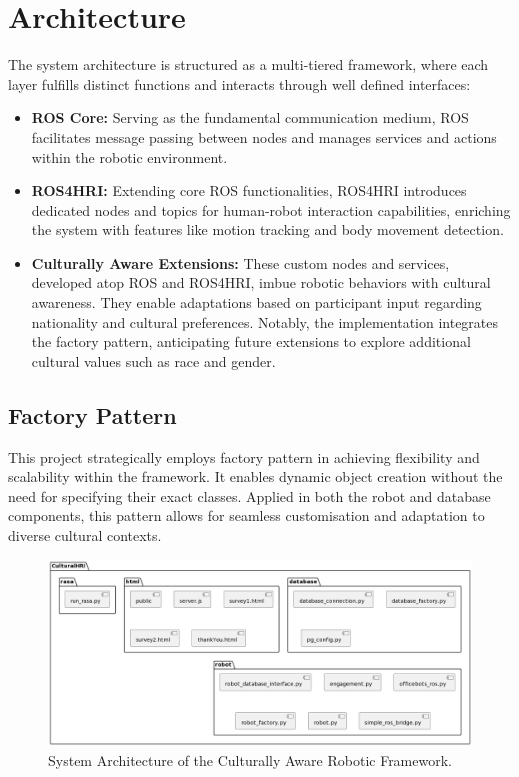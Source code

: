 \section{Architecture}

The system architecture is structured as a multi-tiered framework, where each layer fulfills distinct functions and interacts through well defined interfaces:

\begin{itemize}
    \item \textbf{ROS Core:} Serving as the fundamental communication medium, ROS facilitates message passing between nodes and manages services and actions within the robotic environment.
    \item \textbf{ROS4HRI:} Extending core ROS functionalities, ROS4HRI introduces dedicated nodes and topics for human-robot interaction capabilities, enriching the system with features like motion tracking and body movement detection.
    \item \textbf{Culturally Aware Extensions:} These custom nodes and services, developed atop ROS and ROS4HRI, imbue robotic behaviors with cultural awareness. They enable adaptations based on participant input regarding nationality and cultural preferences. Notably, the implementation integrates the factory pattern, anticipating future extensions to explore additional cultural values such as race and gender.
\end{itemize}

\subsection{Factory Pattern}

This project strategically employs factory pattern in achieving flexibility and scalability within the framework. It enables dynamic object creation without the need for specifying their exact classes. Applied in both the robot and database components, this pattern allows for seamless customisation and adaptation to diverse cultural contexts.

\begin{figure}
    \begin{center}
        \noindent\includegraphics[width=\linewidth]{Chapter6/package.png}  
        \caption{System Architecture of the Culturally Aware Robotic Framework.}
        \label{fig:figure1}
    \end{center}
\end{figure}

